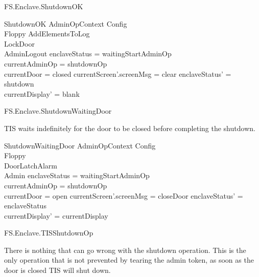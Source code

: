 \begin{traceunit}{FS.Enclave.ShutdownOK}
\end{traceunit}


\begin{schema}{ShutdownOK}
        AdminOpContext
\also   
        \Xi Config
\\      \Xi Floppy
\also
        AddElementsToLog
\\      LockDoor
\\      AdminLogout
\where
        enclaveStatus = waitingStartAdminOp
\\      \The currentAdminOp = shutdownOp
\\      currentDoor = closed
\also
        currentScreen'.screenMsg = clear
\also
        enclaveStatus' = shutdown
\\      currentDisplay' = blank
\end{schema}


\begin{traceunit}{FS.Enclave.ShutdownWaitingDoor}
\end{traceunit}

TIS waits indefinitely for the door to be closed before completing the
shutdown. 

\begin{schema}{ShutdownWaitingDoor}
        AdminOpContext
\also   
        \Xi Config
\\      \Xi Floppy
\\      \Xi DoorLatchAlarm
\\      \Xi Admin
\where
        enclaveStatus = waitingStartAdminOp
\\      \The currentAdminOp = shutdownOp
\\      currentDoor = open
\also
        currentScreen'.screenMsg = closeDoor
\also
        enclaveStatus' = enclaveStatus
\\      currentDisplay' = currentDisplay
\end{schema}

\begin{traceunit}{FS.Enclave.TISShutdownOp}
\end{traceunit}

There is nothing that can go wrong with the shutdown operation. This
is the only operation that is not prevented by tearing the admin
token, as soon as the door is closed TIS will shut down.

